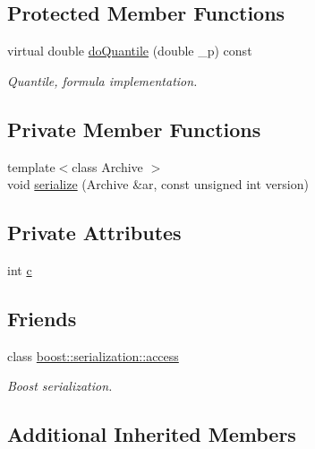 \subsection*{Protected Member Functions}
\begin{DoxyCompactItemize}
\item 
virtual double \hyperlink{class_c_constant_d_r_v_a8ddf0c49c7b4e0a5b593add04721568e}{do\-Quantile} (double \-\_\-p) const 
\begin{DoxyCompactList}\small\item\em Quantile, formula implementation. \end{DoxyCompactList}\end{DoxyCompactItemize}
\subsection*{Private Member Functions}
\begin{DoxyCompactItemize}
\item 
{\footnotesize template$<$class Archive $>$ }\\void \hyperlink{class_c_constant_d_r_v_abe6f147ae70c0e9087e4e2a1fc2f105a}{serialize} (Archive \&ar, const unsigned int version)
\end{DoxyCompactItemize}
\subsection*{Private Attributes}
\begin{DoxyCompactItemize}
\item 
int \hyperlink{class_c_constant_d_r_v_a5cabcca79ea5f4c87e8f6c9b0a4e1412}{c}
\end{DoxyCompactItemize}
\subsection*{Friends}
\begin{DoxyCompactItemize}
\item 
class \hyperlink{class_c_constant_d_r_v_ac98d07dd8f7b70e16ccb9a01abf56b9c}{boost\-::serialization\-::access}
\begin{DoxyCompactList}\small\item\em Boost serialization. \end{DoxyCompactList}\end{DoxyCompactItemize}
\subsection*{Additional Inherited Members}


